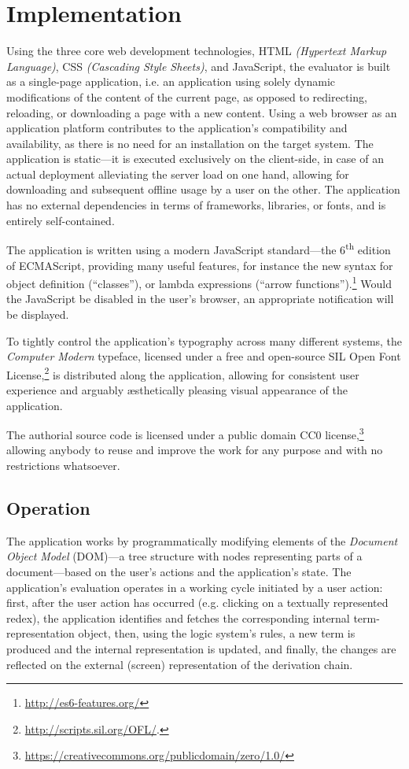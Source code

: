 \documentclass[table, a4paper, 10pt]{book}
\begin{document}
\newpage
\chapter{Implementation}
Using the three core web development technologies,
HTML \textit{(Hypertext Markup Language)}, CSS \textit{(Cascading Style Sheets)}, and JavaScript,
the evaluator is built as a single-page application,
i.e. an application using solely dynamic modifications of the content of the current page,
as opposed to redirecting, reloading, or downloading a page with a new content.
Using a web browser as an application platform contributes
to the application's compatibility and availability, 
as there is no need for an installation on the target system.
The application is static---it is executed exclusively on the client-side,
in case of an actual deployment alleviating the server load on one hand,
allowing for downloading and subsequent offline usage by a user on the other.
The application has no external dependencies in terms of frameworks, libraries, or
fonts, and is entirely self-contained.

The application is written using a modern JavaScript standard---the 6\textsuperscript{th} edition of ECMAScript,
providing many useful features, for instance the new syntax for object definition (``classes''), or
lambda expressions (``arrow functions'').\footnote{\url{http://es6-features.org/}}
Would the JavaScript be disabled in the user's browser, an appropriate notification will be displayed.

To tightly control the application's typography across many different systems,
the \textit{Computer Modern} typeface, licensed under a free and open-source SIL
Open Font License,\footnote{\url{http://scripts.sil.org/OFL/}.}
is distributed along the application, allowing
for consistent user experience and arguably {\ae}sthetically pleasing visual appearance of the application.

The authorial source code is licensed under a public
domain CC0 license,\footnote{\url{https://creativecommons.org/publicdomain/zero/1.0/}}
allowing anybody to reuse and improve the work for any purpose and with no restrictions whatsoever.

\section{Operation}
The application works by programmatically modifying
elements of the \textit{Document Object Model} (DOM)---a tree
structure with nodes representing parts of a document---based
on the user's actions and the application's state. The application's evaluation
operates in a working cycle initiated by a user action:
first, after the user action has
occurred (e.g. clicking on a textually represented redex), the application
identifies and fetches the corresponding internal term-representation object,
then, using the logic system's rules, a new term is produced and the
internal representation is updated, and finally, the changes are reflected
on the external (screen) representation of the derivation chain.
\end{document}
